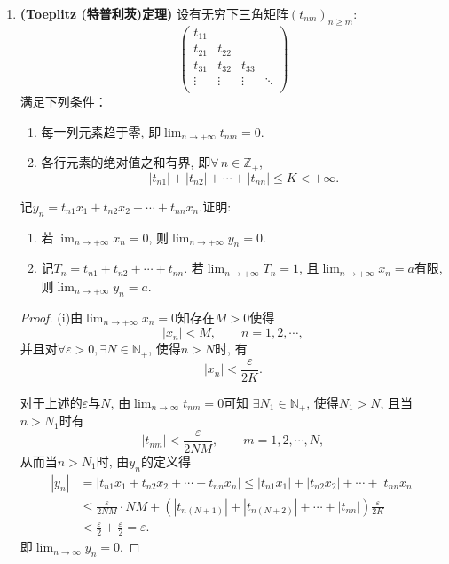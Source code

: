 \begin{2b}
\begin{enumerate}
\item \textbf{(Toeplitz (特普利茨)定理)} 设有无穷下三角矩阵\((t_{nm})_{n\geqslant m}\):
    \[\left(\begin{matrix}
      t_{11}& & & \\
      t_{21}&t_{22}&&\\
      t_{31}&t_{32}&t_{33}&\\
      \vdots&\vdots&\vdots&\ddots\\
    \end{matrix}\right)\]满足下列条件：
\begin{enumerate}[label=(\roman*)]
\item 每一列元素趋于零, 即\(\lim_{n\rightarrow+\infty}t_{nm}=0\).
\item 各行元素的绝对值之和有界, 即\(\forall\, n\in \mathbb{Z}_+\), 
\[\left|t_{n1}\right|+\left|t_{n2}\right|+\cdots+\left|t_{nn}\right|\leqslant K<+\infty.\]  
\end{enumerate}
记\(y_n=t_{n1}x_1+t_{n2}x_2+\cdots+t_{nn}x_n\).证明:
\begin{enumerate}[label=(\roman*)]
\item 若\(\lim_{n\rightarrow+\infty}x_{n}=0\), 则\(\lim_{n\rightarrow+\infty}y_{n}=0\).
\item 记\(T_{n}=t_{n1}+t_{n2}+\cdots+t_{nn}\). 若\(\lim_{n\rightarrow+\infty}T_{n}=1\), 
且\(\lim_{n\rightarrow+\infty}x_{n}=a\)有限, 则\(\lim_{n\rightarrow+\infty}y_{n}=a\).
\end{enumerate}
\begin{proof}
(i)由\(\lim_{n\rightarrow+\infty}x_{n}=0\)知存在\(M>0\)使得
\[|x_n|<M,\qquad n=1,2,\cdots,\]
并且对\(\forall\varepsilon>0,\exists N\in\mathbb{N}_+\), 
使得\(n>N\)时, 有\[|x_n|<\frac{\varepsilon}{2K}.\]

对于上述的\(\varepsilon\)与\(N\), 由\(\lim_{n\rightarrow\infty}t_{nm}=0\)可知
\(\exists N_1\in\mathbb{N}_+\), 使得\(N_1>N\), 且当\(n>N_1\)时有
\[|t_{nm}|<\frac{\varepsilon}{2NM},\qquad m=1,2,\cdots,N,\]
从而当\(n>N_1\)时, 由\(y_n\)的定义得\[\begin{split}
|y_n|&=|t_{n1}x_1+t_{n2}x_2+\cdots+t_{nn}x_n|\leqslant|t_{n1}x_1|+|t_{n2}x_2|+\cdots+|t_{nn}x_n|\\
&\leqslant\frac{\varepsilon}{2NM}\cdot NM+\left(|t_{n(N+1)}|+|t_{n(N+2)}|+\cdots+|t_{nn}|\right)\frac{\varepsilon}{2K}\\
&<\frac{\varepsilon}{2}+\frac{\varepsilon}{2}=\varepsilon.
\end{split}\]即\(\lim_{n\rightarrow\infty}y_n=0.\)


\end{proof}
\end{enumerate}
\end{2b}
